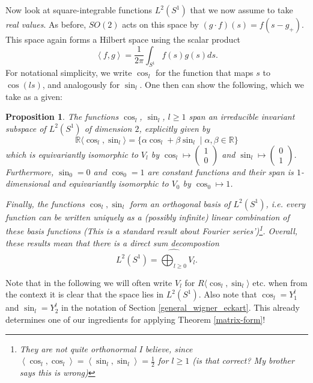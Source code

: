 \documentclass[12pt, a4paper]{article}
\theoremstyle{plain}
\newtheorem{pro}{Proposition}[section]
\theoremstyle{definition}
\theoremstyle{remark}
\newcommand{\R}{\mathds{R}}
\begin{document}
Now look at square-integrable functions $L^2\left(S^1\right)$ that we now assume to take \emph{real values}. As before, $SO(2)$ acts on this space by $(g \cdot f)(s) = f(s - g_{+})$. This space again forms a Hilbert space using the scalar product
\begin{equation*}
\left\langle f, g\right\rangle = \frac{1}{2 \pi} \int_{S^1} f(s) g(s) ds.
\end{equation*}
For notational simplicity, we write $\cos_l$ for the function that maps $s$ to $\cos(ls)$, and analogously for $\sin_l$. One then can show the following, which we take as a given:

\begin{pro}\label{description_L_1}
The functions $\cos_l$, $\sin_l$, $l \geq 1$ span an irreducible invariant subspace of $L^2\left(S^1\right)$ of dimension $2$, explicitly given by
\begin{equation*}
\R\langle \cos_l, \sin_l \rangle = \{\alpha \cos_l + \beta \sin_l \mid \alpha, \beta \in \R \}
\end{equation*}
which is equivariantly isomorphic to $V_l$ by $\cos_l \mapsto \begin{pmatrix} 1 \\ 0\end{pmatrix}$ and $\sin_l \mapsto \begin{pmatrix} 0 \\ 1 \end{pmatrix}$. Furthermore, $\sin_0 = 0$ and $\cos_0 = 1$ are constant functions and their span is $1$-dimensional and equivariantly isomorphic to $V_0$ by $\cos_0 \mapsto 1$. 

Finally, the functions $\cos_l, \sin_l$ form an orthogonal basis of $L^2\left(S^1\right)$, i.e. every function can be written uniquely as a (possibly infinite) linear combination of these basis functions (This is a standard result about Fourier series')\footnote{They are \emph{not quite} orthonormal I believe, since $\left\langle \cos_l, \cos_l \right\rangle = \left\langle \sin_l, \sin_l\right\rangle = \frac{1}{2}$ for $l \geq 1$ (is that correct? My brother says this is wrong)}. Overall, these results mean that there is a direct sum decompostion
\begin{equation*}
L^2\left(S^1\right) = \widehat{\bigoplus_{l \geq 0}} V_l.
\end{equation*}
\end{pro}

Note that in the following we will often write $V_l$ for $R \langle \cos_l, \sin_l \rangle$ etc. when from the context it is clear that the space lies in $L^2\left(S^1\right)$. Also note that $\cos_l = Y^{l}_1$ and $\sin_l = Y^{l}_2$ in the notation of Section \ref{general_wigner_eckart}. This already determines one of our ingredients for applying Theorem \ref{matrix-form}!
\end{document}
